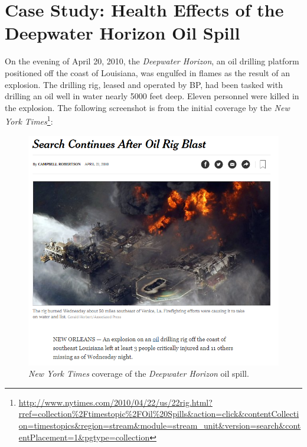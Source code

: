 \documentclass[]{book}
\let\rmarkdownfootnote\footnote%
\def\footnote{\protect\rmarkdownfootnote}
\theoremstyle{plain}
\theoremstyle{mydefn}
\theoremstyle{myexmpl}
\theoremstyle{remark}
\begin{document}
\hypertarget{CaseDeepwater}{\chapter{Case Study: Health Effects of the
Deepwater Horizon Oil Spill}\label{CaseDeepwater}}

On the evening of April 20, 2010, the \emph{Deepwater Horizon}, an oil
drilling platform positioned off the coast of Louisiana, was engulfed in
flames as the result of an explosion. The drilling rig, leased and
operated by BP, had been tasked with drilling an oil well in water
nearly 5000 feet deep. Eleven personnel were killed in the explosion.
The following screenshot is from the initial coverage by the \emph{New
York Times}\footnote{\url{http://www.nytimes.com/2010/04/22/us/22rig.html?rref=collection\%2Ftimestopic\%2FOil\%20Spills\&action=click\&contentCollection=timestopics\&region=stream\&module=stream_unit\&version=search\&contentPlacement=1\&pgtype=collection}}:




\begin{figure}

{\centering \includegraphics[width=0.8\linewidth]{./images/Case-Deepwater-NYTclip} 

}

\caption{\emph{New York Times} coverage of the
\emph{Deepwater Horizon} oil spill.}\label{fig:casedeepwater-nytclip}
\end{figure}
\end{document}
